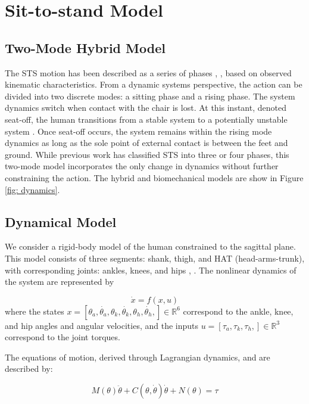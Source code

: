\section{Sit-to-stand Model}

\subsection{Two-Mode Hybrid Model}

The STS motion has been described as a series of phases \cite{etnyre2007}, \cite{schenkman1990}, based on observed kinematic characteristics. From a dynamic systems perspective, the action can be divided into two discrete modes: a sitting phase and a rising phase. The system dynamics switch when contact with the chair is lost. At this instant, denoted seat-off, the human transitions from a stable system to a potentially unstable system \cite{etnyre2007}. Once seat-off occurs, the system remains within the rising mode dynamics as long as the sole point of external contact is between the feet and ground. While previous work has classified STS into three or four phases, this two-mode model incorporates the only change in dynamics without further constraining the action. The hybrid and biomechanical models are show in Figure \ref{fig: dynamics}.

\subsection{Dynamical Model}

We consider a rigid-body model of the human constrained to the sagittal plane. This model consists of three segments: shank, thigh, and HAT (head-arms-trunk), with corresponding joints: ankles, knees, and hips \cite{music2008}, \cite{matthew2016}. The nonlinear dynamics of the system are represented by

\begin{equation}
\dot{x}=f(x,u) 
\end{equation}
where the states $x= \left[\theta_a, \dot{\theta_a}, \theta_k, \dot{\theta_k},\theta_h,\dot{\theta_h}, \right] \in \mathbb{R}^6$ correspond to the ankle, knee, and hip angles and angular velocities, and the inputs $u = \left[\tau_a, \tau_k, \tau_h, \right] \in \mathbb{R}^3$ correspond to the joint torques.

The equations of motion,  derived through Lagrangian dynamics, and are described by:

\begin{equation}
M\left(\theta\right)\ddot{\theta} + C(\theta, \dot{\theta})\dot{\theta} + N \left(\theta\right) = \tau
\end{equation}

